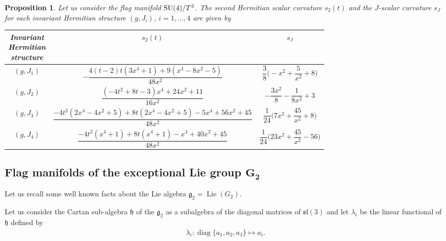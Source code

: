 \documentclass[10pt,a4paper]{amsart}
\numberwithin{equation}{section}
\newtheorem{Proposition}[Theorem]{Proposition}
 { \theoremstyle{definition}
\newtheorem{Definition}[Theorem]{Definition}
\newtheorem{Question}[Theorem]{Question}
\newtheorem*{Notation}{Notation}
\newtheorem{Example}[Theorem]{Example}
\newtheorem{Remark}[Theorem]{Remark} }
\DeclareMathOperator{\Lie}{Lie}
\DeclareMathOperator{\Diag}{diag}
\begin{document}
\begin{Proposition}
Let us consider the flag manifold ${\rm SU}(4)/T^3$. The second Hermitian scalar curvature $s_2(t)$ and the $J$-scalar curvature $s_J$ for each invariant Hermitian structure $(g,J_i)$, $i=1,\ldots, 4$ are given by
\begin{table}[h] \setlength{\tabcolsep}{2.5pt}
\renewcommand{\arraystretch}{2.2}
\centering
\begin{tabular}{c|c|c}
\hline
\parbox[][][c]{18mm}{\vspace{1mm}\centering Invariant\\ Hermitian\\ structure\vspace{1mm}}& $s_2(t)$ & $s_J$
\\
\hline
$(g, J_1)$ & $-\dfrac{4 (t-2) t (3 x^4+1)+9 (x^4-8 x^2-5)}{48 x^2}$ & $\dfrac{3}{8} \bigg({-}x^2+\dfrac{5}{x^2}+8\bigg)$
\\
\hline
$(g, J_2)$ & $\dfrac{(-4 t^2+8 t-3) x^4+24 x^2+11}{16 x^2}$ & $-\dfrac{3 x^2}{8}-\dfrac{1}{8 x^2}+3$
\\
\hline
$(g, J_3)$ & $\dfrac{-4 t^2 (2 x^4\!-4 x^2\!+5)+8 t (2 x^4\!-4 x^2\!+5)-5 x^4+56 x^2+45}{48 x^2}$ & $\dfrac{1}{24} \bigg(7 x^2+\dfrac{45}{x^2}+8\bigg)$
\\
\hline
$(g, J_4)$ & $ \dfrac{-4 t^2 (x^4+1)+8 t (x^4+1)-x^4+40 x^2+45}{48 x^2}$ & $\dfrac{1}{24} \bigg(23 x^2+\dfrac{45}{x^2}-56\bigg)$
\\
\hline
\end{tabular}
\end{table}
\end{Proposition}

\subsection[Flag manifolds of the exceptional Lie group  \protect{$G\textunderscore{}2$}]
{Flag manifolds of the exceptional Lie group $\boldsymbol{G_{2}}$}

Let us recall some well known facts about the Lie algebra $\mathfrak{g}_{2}=\Lie(G_2)$.

Let us consider the Cartan sub-algebra $\mathfrak{h}$ of the $\mathfrak{g_{2}}$ as a subalgebra of the diagonal matrices of $\mathfrak{sl}(3)$ and let $\lambda_{i}$ be the linear functional of $\mathfrak{h}$ defined by
\begin{gather*}
\lambda_{i}\colon  \Diag\{a_{1},a_{2},a_{3}\}\longmapsto a_{i}.
\end{gather*}
\end{document}
